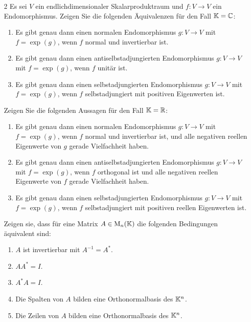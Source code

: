 \begin{question}[subtitle = Charakterisierung von Matrixexponentialen normaler Endomorphismen über Eigenwerte]{2}
  Es sei $V$ ein endlichdimensionaler Skalarproduktraum und $f \colon V \to V$ ein Endomorphismus.
  \newline
  Zeigen Sie die folgenden Äquivalenzen für den Fall $\mathbb{K} = \mathbb{C}$:
  \begin{enumerate}[leftmargin=*]
    \item
      Es gibt genau dann einen normalen Endomorphismus $g \colon V \to V$ mit $f = \exp(g)$, wenn $f$ normal und invertierbar ist.
    \item
      Es gibt genau dann einen antiselbstadjungierten Endomorphismus $g \colon V \to V$ mit $f = \exp(g)$, wenn $f$ unitär ist.
    \item
      Es gibt genau dann einen selbstadjungierten Endomorphismus $g \colon V \to V$ mit $f = \exp(g)$, wenn $f$ selbstadjungiert mit positiven Eigenwerten ist.
  \end{enumerate}
  Zeigen Sie die folgenden Aussagen für den Fall $\mathbb{K} = \mathbb{R}$:
  \begin{enumerate}[leftmargin=*, resume]
    \item
      Es gibt genau dann einen normalen Endomorphismus $g \colon V \to V$ mit $f = \exp(g)$, wenn $f$ normal und invertierbar ist, und alle negativen reellen Eigenwerte von $g$ gerade Vielfachheit haben.
    \item
      Es gibt genau dann einen antiselbstadjungierten Endomorphismus $g \colon V \to V$ mit $f = \exp(g)$, wenn $f$ orthogonal ist und alle negativen reellen Eigenwerte von $f$ gerade Vielfachheit haben.
    \item
      Es gibt genau dann einen selbstadjungierten Endomorphismus $g \colon V \to V$ mit $f = \exp(g)$, wenn $f$ selbstadjungiert mit positiven reellen Eigenwerten ist.
  \end{enumerate}
\end{question}







\begin{question}[subtitle = Die Definitionen unitärer Matrizen]{3}
Zeigen sie, dass für eine Matrix $A \in \operatorname{M}_n(\mathbb{K})$ die folgenden Bedingungen äquivalent sind:
  \begin{enumerate}
    \item
      $A$ ist invertierbar mit $A^{-1} = A^*$.
    \item
      $A A^* = I$.
    \item
      $A^* A = I$.
    \item
      Die Spalten von $A$ bilden eine Orthonormalbasis des $\mathbb{K}^n$.
    \item
      Die Zeilen von $A$ bilden eine Orthonormalbasis des $\mathbb{K}^n$.
  \end{enumerate}
\end{question}


